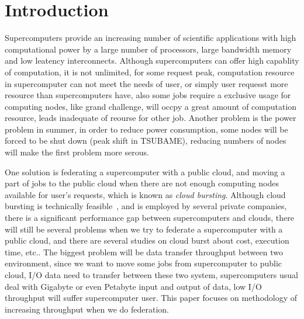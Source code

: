 \section{Introduction}
\label{sec:introduction}
Supercomputers provide an increasing number of scientific applications with high computational power by a large number of processors, large bandwidth memory and low leatency interconnects.
Although supercomputers can offer high capablity of computation, it is not unlimited, for some request peak, computation resource in supercomputer can not meet the needs of user, or simply user requesst more resource than supercomputers have, also some jobs require a exclusive usage for computing nodes, like grand challenge, will occpy a great amount of computation resource, leads inadequate of reourse for other job.
Another problem is the power problem in summer, in order to reduce power consumption, some nodes will be forced to be shut down (peak shift in TSUBAME\cite{TSUBAME}), reducing numbers of nodes will make the first problem more serous.

One solution is federating a supercomputer with a public cloud,
and moving a part of jobs to the public cloud when there are not enough
computing nodes available for user's requests, which is known as \emph{cloud bursting}.
Although cloud bursting is technically feasible~\cite{Eucalyptus,stratos,Seagull}, 
and is employed by several private companies, 
there is a significant performance gap between supercomputers and clouds, 
there will still be several problems when we try to federate a supercomputer with a public cloud, 
and there are several studies on cloud burst about cost\cite{Seagull}, execution time\cite{time_and_cost}, etc..
The biggest problem will be data transfer throughput between two environment, 
since we want to move some jobs from supercomputer to public cloud, I/O data need to transfer between these two system, supercomputers usual deal with Gigabyte or even Petabyte input and output of data, 
low I/O throughput will suffer supercomputer user. This paper focuses on methodology 
of increasing throughput when we do federation.

